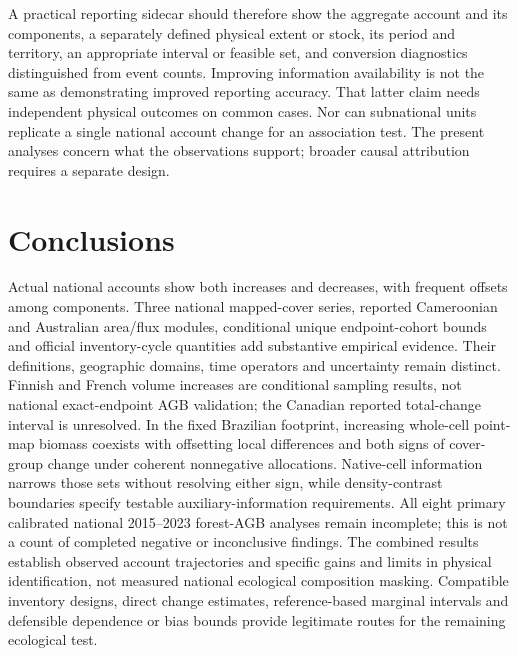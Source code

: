 \documentclass[11pt,a4paper]{article}
\begin{document}
A practical reporting sidecar should therefore show the aggregate account and its components, a separately defined physical extent or stock, its period and territory, an appropriate interval or feasible set, and conversion diagnostics distinguished from event counts. Improving information availability is not the same as demonstrating improved reporting accuracy. That latter claim needs independent physical outcomes on common cases. Nor can subnational units replicate a single national account change for an association test. The present analyses concern what the observations support; broader causal attribution requires a separate design.

\section{Conclusions}
Actual national accounts show both increases and decreases, with frequent offsets among components. Three national mapped-cover series, reported Cameroonian and Australian area/flux modules, conditional unique endpoint-cohort bounds and official inventory-cycle quantities add substantive empirical evidence. Their definitions, geographic domains, time operators and uncertainty remain distinct. Finnish and French volume increases are conditional sampling results, not national exact-endpoint AGB validation; the Canadian reported total-change interval is unresolved. In the fixed Brazilian footprint, increasing whole-cell point-map biomass coexists with offsetting local differences and both signs of cover-group change under coherent nonnegative allocations. Native-cell information narrows those sets without resolving either sign, while density-contrast boundaries specify testable auxiliary-information requirements. All eight primary calibrated national 2015--2023 forest-AGB analyses remain incomplete; this is not a count of completed negative or inconclusive findings. The combined results establish observed account trajectories and specific gains and limits in physical identification, not measured national ecological composition masking. Compatible inventory designs, direct change estimates, reference-based marginal intervals and defensible dependence or bias bounds provide legitimate routes for the remaining ecological test.
\end{document}
